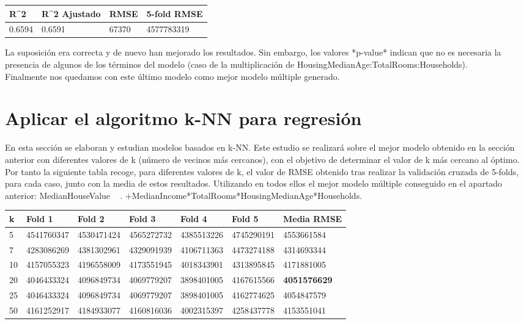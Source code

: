 \begin{table}[!h]
	\centering
	\begin{tabular}{llll}
		R\textasciicircum{}2 & R\textasciicircum{}2 Ajustado & RMSE  & 5-fold RMSE \\ \hline
		0.6594               & 0.6591                        & 67370 & 4577783319 
	\end{tabular}
\end{table}

La suposición era correcta y de nuevo han mejorado los resultados. Sin embargo, los valores *p-value* indican que no es necesaria la presencia de algunos de los términos del modelo (caso de la multiplicación de HousingMedianAge:TotalRooms:Households).\\ 

Finalmente nos quedamos con este último modelo como mejor modelo múltiple generado.








\newpage
\section{Aplicar el algoritmo k-NN para regresión}
En esta sección se elaboran y estudian modelos basados en k-NN. Este estudio se realizará sobre el mejor modelo obtenido en la sección anterior con diferentes valores de k (número de vecinos más cercanos), con el objetivo de determinar el valor de k más cercano al óptimo. \\

Por tanto la siguiente tabla recoge, para diferentes valores de k, el valor de RMSE obtenido tras realizar la validación cruzada de 5-folds, para cada caso, junto con la media de estos resultados. Utilizando en todos ellos el mejor modelo múltiple conseguido en el apartado anterior: MedianHouseValue ~ . +MedianIncome*TotalRooms*HousingMedianAge*Households.

\begin{table}[!h]
	\begin{tabular}{l|llllll}
		k  & Fold 1     & Fold 2     & Fold 3     & Fold 4     & Fold 5     & Media RMSE          \\ \hline
		5  & 4541760347 & 4530471424 & 4565272732 & 4385513226 & 4745290191 & 4553661584          \\
		7  & 4283086269 & 4381302961 & 4329091939 & 4106711363 & 4473274188 & 4314693344          \\
		10 & 4157055323 & 4196558009 & 4173551945 & 4018343901 & 4313895845 & 4171881005          \\
		20 & 4046433324 & 4096849734 & 4069779207 & 3898401005 & 4167615566 & \textbf{4051576629} \\
		25 & 4046433324 & 4096849734 & 4069779207 & 3898401005 & 4162774625 & 4054847579          \\
		50 & 4161252917 & 4184933077 & 4160816036 & 4002315397 & 4258437778 & 4153551041         
	\end{tabular}
\end{table}


